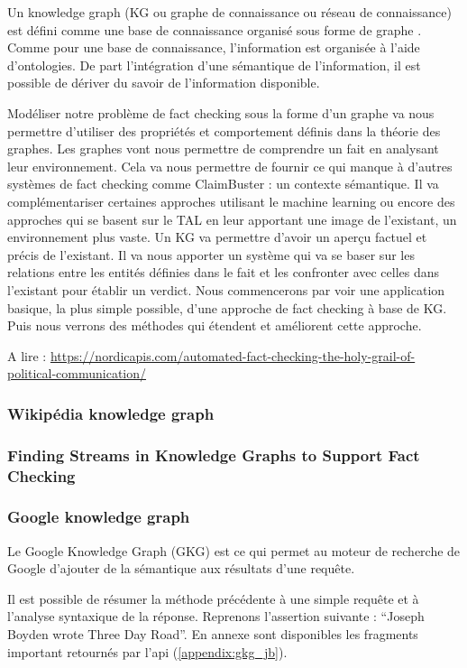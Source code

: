 Un knowledge graph (KG ou graphe de connaissance ou réseau de connaissance) est défini comme une base de connaissance organisé sous forme de graphe \cite{ehrlinger2016towards} \cite{JoStichburyKG}. Comme pour une base de connaissance, l'information est organisée à l'aide d'ontologies. De part l'intégration d'une sémantique de l'information, il est possible de dériver du savoir de l'information disponible. 

Modéliser notre problème de fact checking sous la forme d'un graphe va nous permettre d'utiliser des propriétés et comportement définis dans la théorie des graphes. Les graphes vont nous permettre de comprendre un fait en analysant leur environnement. Cela va nous permettre de fournir ce qui manque à d'autres systèmes de fact checking comme ClaimBuster : un contexte sémantique. Il va complémentariser certaines approches utilisant le machine learning ou encore des approches qui se basent sur le TAL en leur apportant une image de l'existant, un environnement plus vaste. Un KG va permettre d'avoir un aperçu factuel et précis de l'existant. Il va nous apporter un système qui va se baser sur les relations entre les entités définies dans le fait et les confronter avec celles dans l'existant pour établir un verdict. 
Nous commencerons par voir une application basique, la plus simple possible, d'une approche de fact checking à base de KG. Puis nous verrons des méthodes qui étendent et améliorent cette approche.

A lire : \url{https://nordicapis.com/automated-fact-checking-the-holy-grail-of-political-communication/}

\subsubsection{Wikipédia knowledge graph}



\subsubsection{Finding Streams in Knowledge Graphs to Support Fact Checking} 



\subsubsection{Google knowledge graph}



Le Google Knowledge Graph (GKG) est ce qui permet au moteur de recherche de Google d'ajouter de la sémantique aux résultats d'une requête.

Il est possible de résumer la méthode précédente à une simple requête et à l'analyse syntaxique de la réponse. Reprenons l'assertion suivante : \enquote{Joseph Boyden wrote Three Day Road}. En annexe sont disponibles les fragments important retournés par l'api (\ref{appendix:gkg_jb}).
